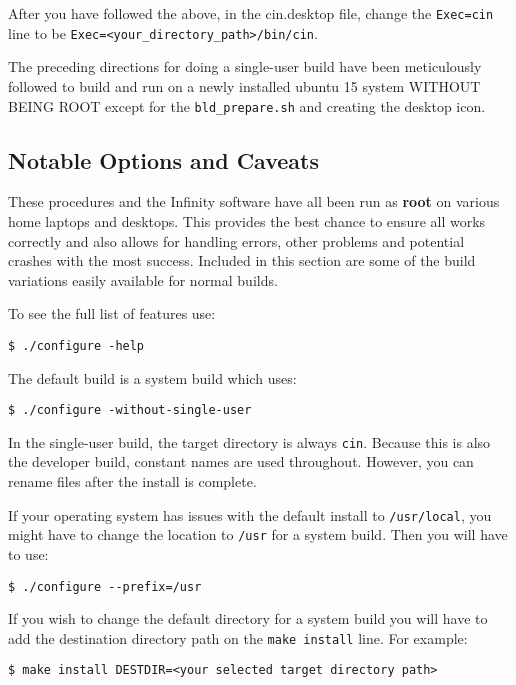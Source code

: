 After you have followed the above, in the cin.desktop file, change the \texttt{Exec=cin} line
to be \texttt{Exec=<your\_directory\_path>/bin/cin}.

The preceding directions for doing a single-user build have been meticulously followed to build and run
on a newly installed ubuntu 15 system WITHOUT BEING ROOT except for the \texttt{bld\_prepare.sh} and creating the desktop icon.

\subsection{Notable Options and Caveats}%
\label{sub:notable_options_and_caveats}

These procedures and the \CGG{} Infinity software have all been run as \textbf{root} on various home laptops and desktops. This provides the best chance to ensure all works correctly and also allows for handling errors, other problems and potential crashes with the most success.  Included in this section are some of the build variations easily available for normal builds.

To see the full list of features use:	 

\begin{lstlisting}[numbers=none]
$ ./configure -help
\end{lstlisting}
The default build is a system build which uses:    

\begin{lstlisting}[numbers=none]
$ ./configure -without-single-user
\end{lstlisting}

In the single-user build, the target directory is always \texttt{cin}.  
Because this is also the developer build, constant names are used throughout.  
However, you can rename files after the install is complete.

If your operating system has issues with the default install to \texttt{/usr/local}, you might have to change the location to \texttt{/usr} for a system build.  Then you will have to use:
\begin{lstlisting}[numbers=none]
$ ./configure --prefix=/usr
\end{lstlisting}

If you wish to change the default directory for a system build you will have to add the destination directory path on the \texttt{make install} line.  For example:
\begin{lstlisting}[numbers=none]
$ make install DESTDIR=<your selected target directory path>
\end{lstlisting}

